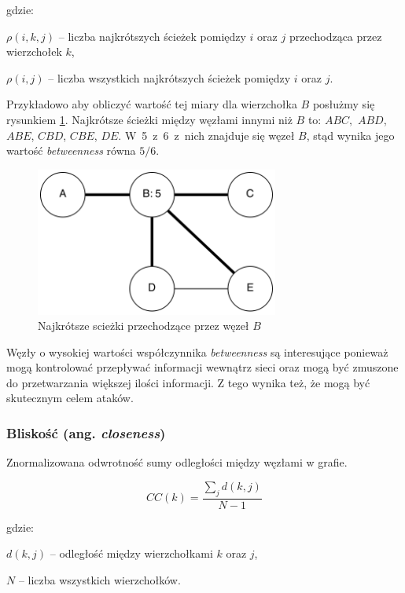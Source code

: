 gdzie:

$\rho(i, k, j)$ -- liczba najkrótszych ścieżek pomiędzy $i$ oraz $j$ przechodząca
przez wierzchołek $k$,

$\rho(i, j)$ -- liczba wszystkich najkrótszych ścieżek pomiędzy $i$ oraz $j$.

\bigskip

Przykładowo aby obliczyć wartość tej miary dla wierzchołka $B$ posłużmy się rysunkiem 
\ref{image:betweenness}.
Najkrótsze ścieżki między węzłami innymi niż $B$ to: $ABC,$ $ABD$, $ABE$, $CBD$, $CBE$, $DE$.
\mbox{W 5 z 6 z nich} znajduje się węzeł $B$, stąd wynika jego wartość \textit{betweenness}
równa $5/6$. 

\begin{figure}[ht!]
\centering
\includegraphics[width=80mm]{img/betweenness.png}
\caption{Najkrótsze scieżki przechodzące przez węzeł $B$}
\label{image:betweenness}
\end{figure}

Węzły o wysokiej wartości współczynnika \textit{betweenness} są interesujące
ponieważ mogą kontrolować przepływać informacji wewnątrz sieci oraz
mogą być zmuszone do przetwarzania większej ilości informacji.
Z tego wynika też, że mogą być skutecznym celem ataków.
    
  
\clearpage  
\subsubsection{Bliskość (ang. \textit{closeness})}  
Znormalizowana odwrotność sumy odległości między węzłami w grafie.
  
\begin{equation}
CC(k) = \frac{\sum\limits_{j}d(k, j)}{N - 1}
\end{equation}  

gdzie:

$d(k, j)$ -- odległość między wierzchołkami $k$ oraz $j$,

$N$ -- liczba wszystkich wierzchołków.

\bigskip

